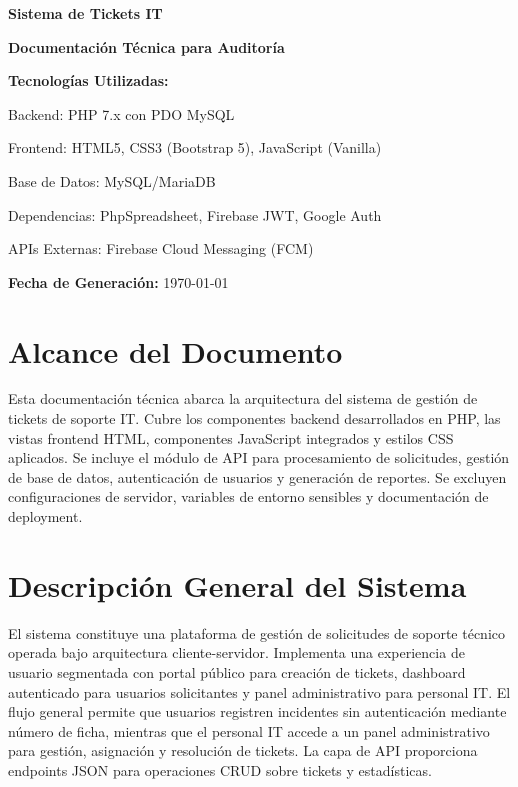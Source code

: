 \documentclass[12pt,a4paper]{article}
\title{}
\author{}
\date{}
\begin{document}
\begin{titlepage}
\centering
\vspace*{2cm}

\textbf{\LARGE Sistema de Tickets IT}

\vspace{1.5cm}

\textbf{\Large Documentación Técnica para Auditoría}

\vspace{2cm}

\textbf{Tecnologías Utilizadas:}

\vspace{0.5cm}

Backend: PHP 7.x con PDO MySQL

Frontend: HTML5, CSS3 (Bootstrap 5), JavaScript (Vanilla)

Base de Datos: MySQL/MariaDB

Dependencias: PhpSpreadsheet, Firebase JWT, Google Auth

APIs Externas: Firebase Cloud Messaging (FCM)

\vspace{2cm}

\textbf{Fecha de Generación:} \today

\end{titlepage}

\tableofcontents
\newpage

\section{Alcance del Documento}

Esta documentación técnica abarca la arquitectura del sistema de gestión de tickets de soporte IT. Cubre los componentes backend desarrollados en PHP, las vistas frontend HTML, componentes JavaScript integrados y estilos CSS aplicados. Se incluye el módulo de API para procesamiento de solicitudes, gestión de base de datos, autenticación de usuarios y generación de reportes. Se excluyen configuraciones de servidor, variables de entorno sensibles y documentación de deployment.

\section{Descripción General del Sistema}

El sistema constituye una plataforma de gestión de solicitudes de soporte técnico operada bajo arquitectura cliente-servidor. Implementa una experiencia de usuario segmentada con portal público para creación de tickets, dashboard autenticado para usuarios solicitantes y panel administrativo para personal IT. El flujo general permite que usuarios registren incidentes sin autenticación mediante número de ficha, mientras que el personal IT accede a un panel administrativo para gestión, asignación y resolución de tickets. La capa de API proporciona endpoints JSON para operaciones CRUD sobre tickets y estadísticas.
\end{document}
